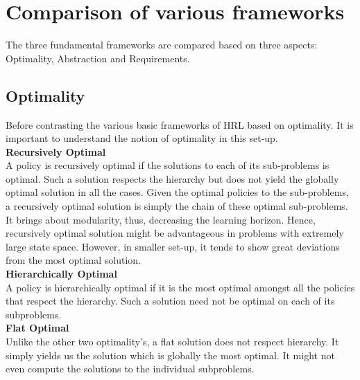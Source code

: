 \section{Comparison of various frameworks}

The three fundamental frameworks are compared based on three aspects: Optimality, Abstraction and Requirements. 

\subsection{Optimality}
Before contrasting the various basic frameworks of HRL based on optimality. It is important to understand the notion of optimality in this set-up. \\

\textbf{Recursively Optimal} \\
A policy is recursively optimal if the solutions to each of its sub-problems is optimal. Such a solution respects the hierarchy but does not yield the globally optimal solution in all the cases. Given the optimal policies to the sub-problems, a recursively optimal solution is simply the chain of these optimal sub-problems. It brings about modularity, thus, decreasing the learning horizon. Hence, recursively optimal solution might be advantageous in problems with extremely large state space. However, in smaller set-up, it tends to show great deviations from the most optimal solution. \\

\textbf{Hierarchically Optimal} \\
A policy is hierarchically optimal if it is the most optimal amongst all the policies that respect the hierarchy. Such a solution need not be optimal on each of its subproblems. \\

\textbf{Flat Optimal} \\
Unlike the other two optimality’s, a flat solution does not respect hierarchy. It simply yields us the solution which is globally the most optimal. It might not even compute the solutions to the individual subproblems. \\


